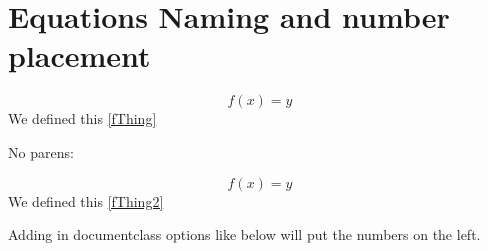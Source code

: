 \section{Equations Naming and number placement}

\begin{example}
\begin{equation}
f(x) = y \tag{Fancy Thing}\label{fThing}
\end{equation}
We defined this \eqref{fThing}
\end{example}

No parens:\\
\begin{example}
\begin{equation}
f(x) = y \tag*{Fancy Thing}\label{fThing2}
\end{equation}
We defined this \eqref{fThing2}
\end{example}

Adding  in documentclass options like below will put the numbers on
the left.\\
